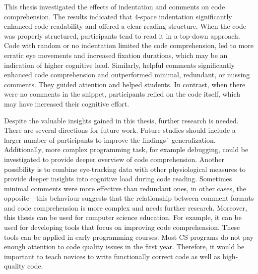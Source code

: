 This thesis investigated the effects of indentation and comments on code comprehension. The results indicated that 4-space indentation significantly enhanced code readability and offered a clear reading structure. When the code was properly structured, participants tend to read it in a top-down approach. Code with random or no indentation limited the code comprehension, led to more erratic eye movements and increased fixation durations, which may be an indication of higher cognitive load.  Similarly, helpful comments significantly enhanced code comprehension and outperformed minimal, redundant, or missing comments.  They guided attention and helped students. In contrast, when there were no comments in the snippet, participants relied on the code itself, which may have increased their cognitive effort.
 
Despite the valuable insights gained in this thesis, further research is needed. There are several directions for future work.  Future studies should include a larger number of participants to improve the findings´ generalization. Additionally, more complex programming task, for example debugging, could be investigated to provide deeper overview of code comprehension. Another possibility is to combine eye-tracking data with other physiological measures to provide deeper insights into cognitive load during code reading. Sometimes minimal comments were more effective than redundant ones, in other cases, the opposite—this behaviour suggests that the relationship between comment formats and code comprehension is more complex and needs further research.  Moreover, this thesis can be used for computer science education. For example, it can be used for developing tools that focus on improving code comprehension. These tools can be applied in early programming courses. Most CS programs do not pay enough attention to code quality issues in the first year. Therefore, it would be important to teach novices to write functionally correct code as well as high-quality code.   


